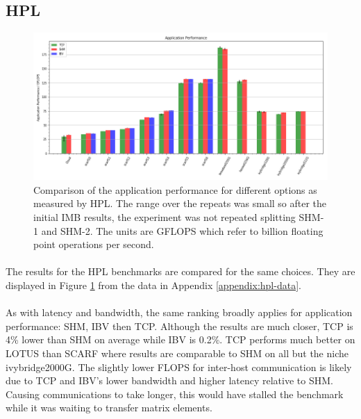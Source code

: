 \documentclass{article}
\begin{document}
    \subsection{HPL}
        \begin{figure}
            \centering
            \includegraphics[width=\textwidth]{application_performance}
            \caption{Comparison of the application performance for different options as measured by HPL. The range over the repeats was small so after the initial IMB results, the experiment was not repeated splitting SHM-1 and SHM-2. The units are GFLOPS which refer to billion floating point operations per second.}
            \label{fig:application_performance}
        \end{figure}

        \paragraph{}
        The results for the HPL benchmarks are compared for the same choices. They are displayed in Figure \ref{fig:application_performance} from the data in Appendix \ref{appendix:hpl-data}.


        \paragraph{}
        As with latency and bandwidth, the same ranking broadly applies for application performance: SHM, IBV then TCP. Although the results are much closer, TCP is 4\% lower than SHM on average while IBV is 0.2\%. TCP performs much better on LOTUS than SCARF where results are comparable to SHM on all but the niche ivybridge2000G. The slightly lower FLOPS for inter-host communication is likely due to TCP and IBV's lower bandwidth and higher latency relative to SHM. Causing communications to take longer, this would have stalled the benchmark while it was waiting to transfer matrix elements.
\end{document}
